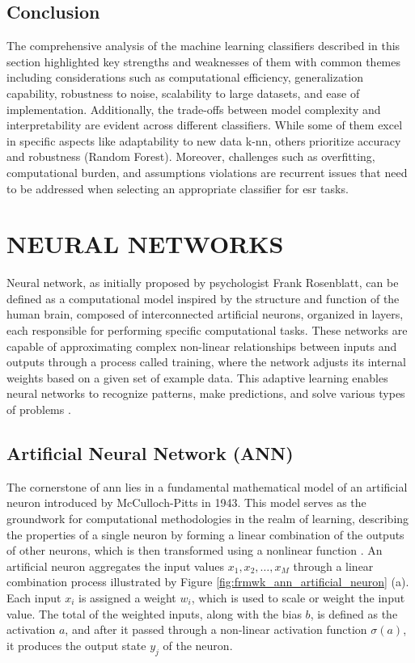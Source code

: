 \subsection{Conclusion}
\label{subsec:machine_learning_conclusion}

The comprehensive analysis of the machine learning classifiers described in this section highlighted key strengths and weaknesses of them with common themes including considerations such as computational efficiency, generalization capability, robustness to noise, scalability to large datasets, and ease of implementation. Additionally, the trade-offs between model complexity and interpretability are evident across different classifiers. While some of them excel in specific aspects like adaptability to new data \gls{k-nn}, others prioritize accuracy and robustness (Random Forest). Moreover, challenges such as overfitting, computational burden, and assumptions violations are recurrent issues that need to be addressed when selecting an appropriate classifier for \gls{esr} tasks. 


\section{NEURAL NETWORKS}
\label{sec:frmwk_neural_networks}

 Neural network, as initially proposed by psychologist Frank Rosenblatt, can be defined as a computational model inspired by the structure and function of the human brain, composed of interconnected artificial neurons, organized in layers, each responsible for performing specific computational tasks. These networks are capable of approximating complex non-linear relationships between inputs and outputs through a process called training, where the network adjusts its internal weights based on a given set of example data. This adaptive learning enables neural networks to recognize patterns, make predictions, and solve various types of problems \cite{Rosenblatt1958}.
 

\subsection{Artificial Neural Network (ANN)}
\label{subsec:neural_network_ANN}

The cornerstone of \gls{ann} lies in a fundamental mathematical model of an artificial neuron introduced by McCulloch-Pitts in 1943. This model serves as the groundwork for computational methodologies in the realm of learning, describing the properties of a single neuron by forming a linear combination of the outputs of other neurons, which is then transformed using a nonlinear function \cite{Bishop2023}. An artificial neuron aggregates the input values {$x_1, x_2, \ldots , x_M$} through a linear combination process illustrated by Figure \ref{fig:frmwk_ann_artificial_neuron} (a). Each input $x_i$ is assigned a weight $w_i$, which is used to scale or weight the input value. The total of the weighted inputs, along with the bias $b$, is defined as the activation $a$, and after it passed through a non-linear activation function $\sigma(a)$, it produces the output state $y_j$ of the neuron. 

